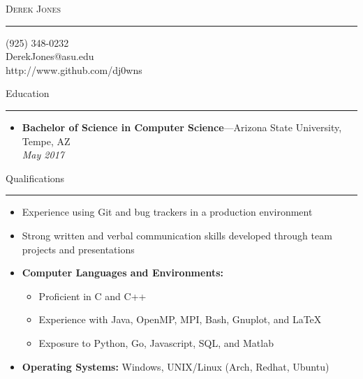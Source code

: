 \documentclass[10pt,oneside]{article}
\makeatletter
\newcommand{\name}{Derek Jones}
\newcommand{\cellphone}{(925) 348-0232}
\newcommand{\email}{DerekJones@asu.edu}
\newcommand{\github}{http://www.github.com/dj0wns}
\newcommand{\bigname}[1]{
  \begin{center}\huge\scshape#1\end{center}
}
\newcommand{\sectitle}[1]{
  \begin{flushleft}{\selectfont\Large#1}\end{flushleft}
}
\newenvironment{ressection}[1]{
  \vspace{2pt}
  \sectitle{#1}
  \vspace{-10pt}\rule{\textwidth}{0.5pt}
  \vspace{-10pt}
  \begin{itemize}[leftmargin=13pt]
  \vspace{3pt}
}{
  \end{itemize}
}
\newcommand{\resitem}[1]{
  \vspace{-4pt}
  \item \begin{flushleft} #1 \end{flushleft}
}
\newcommand{\ressubitem}[1]{
  \vspace{-1pt}
  \item \begin{flushleft} #1 \end{flushleft}
}
\newcommand{\resbigitem}[3]{
  \vspace{-5pt}
  \item
  \textbf{#1}---#2 \\
  \textit{#3}
}
\newenvironment{reslist}[1]{
  \resitem{\textbf{#1}}
  \vspace{-5pt}
  \begin{itemize}
}{
  \end{itemize}
}
\makeatother
\begin{document}
 \selectfont

\bigname{\name}
\vspace{-6pt} \rule{\textwidth}{1pt}
\vspace{-10pt}

\begin{center}
  \cellphone \\
  \email \\
  \github \\
\end{center}

\vspace{-26 pt}




\vspace{\baselineskip}
\begin{ressection}{Education}
  \resbigitem{Bachelor of Science in Computer Science}{Arizona State University, Tempe, AZ}{May 2017}
\end{ressection}


\begin{ressection}{Qualifications}

  \resitem{Experience using Git and bug trackers in a production environment}

  \resitem{Strong written and verbal communication skills developed through team projects and presentations}

  \begin{reslist}{Computer Languages and Environments:}
    \ressubitem{Proficient in C and C++}
    \ressubitem{Experience with Java, OpenMP, MPI, Bash, Gnuplot, and LaTeX}
    \ressubitem{Exposure to Python, Go, Javascript, SQL, and Matlab}
  \end{reslist}

  \resitem{\textbf{Operating Systems:} Windows,
  UNIX/Linux (Arch, Redhat, Ubuntu)}

\end{ressection}
\end{document}
